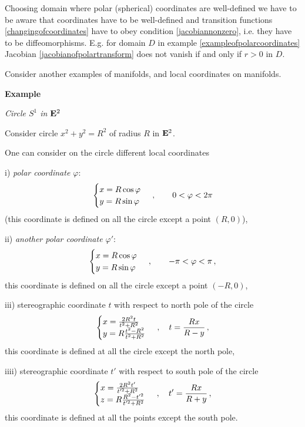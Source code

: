 \documentclass[12pt]{article}
\theoremstyle{theorem}
\numberwithin{equation}{section}
\begin{document}
 Choosing domain where polar (spherical) 
coordinates are well-defined
we have to be aware
that coordinates have to be well-defined and
transition functions \eqref{changingofcoordinates}
have to obey condition \eqref{jacobiannonzero}, i.e. they
  have to be diffeomorphisms. E.g. for domain $D$
in example \eqref{exampleofpolarcoordinates} Jacobian
\eqref{jacobianofpolartransform} does not vanish if and only if
   $r>0$ in $D$.
\m

Consider another examples of manifolds,
and local coordinates on manifolds.

 
{\bf Example}  

 \centerline {\it  Circle  $S^1$ in ${\bf E}^2$}

Consider circle $x^2+y^2=R^2$ of 
radius $R$ in ${\bf E}^2$.

One can consider on the circle 
different local coordinates

i) {\it polar coordinate $\varphi$}:
    \begin{equation*}
      \begin{cases}
    x=R\cos\varphi\cr
    y=R\sin\varphi\cr
      \end{cases}\,,\qquad 0<\varphi<2\pi
     \end{equation*}
(this coordinate is defined on all the circle 
except a point $(R,0)$),

ii) {\it another polar coordinate $\varphi'$}:
    \begin{equation*}
      \begin{cases}
    x=R\cos\varphi\cr
    y=R\sin\varphi\cr
      \end{cases}\,,\qquad -\pi<\varphi<\pi\,,
     \end{equation*}
this coordinate is defined on all the circle 
except a point $(-R,0)$,

iii)  stereographic coordinate $t$
with respect to north pole of the circle
     \begin{equation}\label{stereogrcoordoncircle}
      \begin{cases}
    x={2R^2t\over t^2+R^2}\cr
    y=R{t^2-R^2\over t^2+R^2} \cr
      \end{cases}\,,\quad
       t={Rx\over R-y}\,,
    \end{equation}
this coordinate is defined at all the 
circle except the north pole,

iiii)  stereographic coordinate $t'$
with respect to south pole of the circle
     \begin{equation*}
      \begin{cases}
    x={2R^2t'\over t'^2+R^2}\cr
  z=R{R^2-t'^2\over t'^2+R^2} \cr
      \end{cases}\,,\quad
       t'={Rx\over R+y}\,,
     \end{equation*}
this coordinate is defined at all the points except
the south pole.
\end{document}
